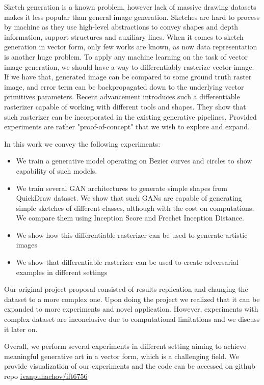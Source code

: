 \documentclass{article}
\begin{document}
	Sketch generation is a known problem, however lack of massive drawing datasets makes it less popular than general image generation. Sketches are hard to process by machine as they use high-level abstractions to convey shapes and depth information, support structures and auxiliary lines. When it comes to sketch generation in vector form, only few works are known, as now data representation is another huge problem. To apply any machine learning on the task of vector image generation, we should have a way to differentiably rasterize vector image. If we have that, generated image can be compared to some ground truth raster image, and error term can be backpropagated down to the underlying vector primitives parameters. Recent advancement  \cite{diffsvg} introduces such a differentiable rasterizer capable of working with different tools and shapes. They show that such rasterizer can be incorporated in the existing generative pipelines. Provided experiments are rather "proof-of-concept" that we wish to explore and expand.
	
	In this work we convey the following experiments:
	
	\begin{itemize}
		\item We train a generative model operating on Bezier curves and circles to show capability of such models.
		\item We train several GAN architectures to generate simple shapes from QuickDraw dataset. We show that such GANs are capable of generating simple sketches of different classes, although with the cost on computations. We compare them using Inception Score and Frechet Inception Distance.
		\item We show how this differentiable rasterizer can be used to generate artistic images
		\item We show that differentiable rasterizer can be used to create adversarial examples in different settings
	\end{itemize}

	Our original project proposal consisted of results replication and changing the dataset to a more complex one. Upon doing the project we realized that it can be expanded to more experiments and novel application. However, experiments with complex dataset are inconclusive due to computational limitations and we discuss it later on.
	
	Overall, we perform several experiments in different setting aiming to achieve meaningful generative art in a vector form, which is a challenging field. We provide visualization of our experiments and the code can be accessed on github repo \href{https://github.com/ivanpuhachov/ift6756}{ivanpuhachov/ift6756}
	
\end{document}
